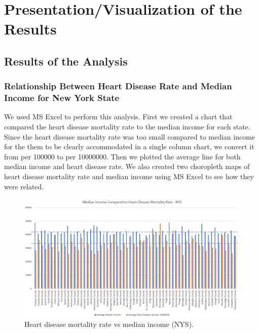 \documentclass[journal,12pt,onecolumn]{IEEEtran}
\begin{document}
\section{Presentation/Visualization of the Results}
\subsection{Results of the Analysis}
\subsubsection{Relationship Between Heart Disease Rate and Median Income for New York State}
We used MS Excel to perform this analysis.
First we created a chart that compared the heart disease mortality rate to the median income for each state.
Since the heart disease mortality rate was too small compared to median income for the them to be clearly accommodated in a single column chart, we convert it from per 100000 to per 10000000.
Then we plotted the average line for both median income and heart disease rate.
We also created two choropleth maps of heart disease mortality rate and median income using MS Excel to see how they were related.

\begin{figure}[H]
\centering
\includegraphics[width=\textwidth]{figures/column.PNG}
\caption{Heart disease mortality rate vs median income (NYS).}
\label{fig:col1}
\end{figure}
\end{document}
